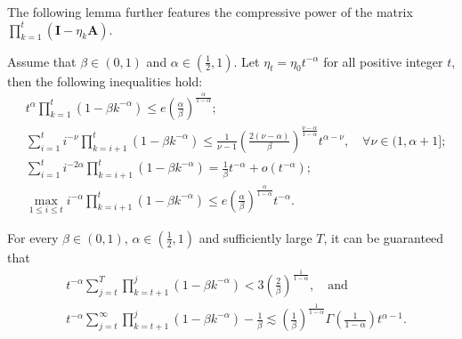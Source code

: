 The following lemma further features the compressive power of the matrix $\prod_{k=1}^t (\bm{I} - \eta_k \bm{A})$.
\begin{customlemma}\label{lemma:R}
Assume that $\beta \in (0,1)$ and $\alpha \in (\frac{1}{2},1)$. Let $\eta_t = \eta_0 t^{-\alpha}$ for all positive integer $t$, then the following inequalities hold:
\begin{align}
&t^{\alpha} \prod_{k=1}^t \left(1-\beta k^{-\alpha} \right) \leq e \left(\frac{\alpha}{\beta}\right)^{\frac{\alpha}{1-\alpha}} ;\label{eq:lemma-R-1} \\ 
&\sum_{i=1}^t i^{-\nu} \prod_{k=i+1}^t \left(1-\beta k^{-\alpha} \right) \leq \frac{1}{\nu-1} \left(\frac{2(\nu-\alpha)}{\beta}\right)^{\frac{\nu-\alpha}{1-\alpha}} t^{\alpha-\nu}, \quad \forall \nu \in (1,\alpha+1]; \label{eq:lemma-R-2} \\ 
&\sum_{i=1}^t i^{-2\alpha} \prod_{k=i+1}^t \left(1-\beta k^{-\alpha} \right)  = \frac{1}{\beta}t^{-\alpha} + o\left(t^{-\alpha}\right); \label{eq:lemma-R-3} \\ 
&\max_{1 \leq i \leq t} i^{-\alpha} \prod_{k=i+1}^t \left(1-\beta k^{-\alpha} \right) \leq e \left(\frac{\alpha}{\beta}\right)^{\frac{\alpha}{1-\alpha}} t^{-\alpha}. \label{eq:lemma-R-4}
\end{align} 
\end{customlemma}

\begin{customlemma}\label{lemma:Q-uni}
For every $\beta \in (0,1)$, $\alpha \in (\frac{1}{2},1)$ and sufficiently large $T$, it can be guaranteed that
\begin{align}
&t^{-\alpha} \sum_{j=t}^T \prod_{k=t+1}^j (1-\beta k^{-\alpha}) < 3\left(\frac{2}{\beta}\right)^{\frac{1}{1-\alpha}}, \quad \text{and} \label{eq:Q-uni-1}\\ 
&t^{-\alpha} \sum_{j=t}^\infty \prod_{k=t+1}^j (1-\beta k^{-\alpha}) - \frac{1}{\beta} \lesssim  \left(\frac{1}{\beta}\right)^{\frac{1}{1-\alpha}}\Gamma\left(\frac{1}{1-\alpha}\right) t^{\alpha-1}. \label{eq:Q-uni-2}
\end{align}
\end{customlemma}

